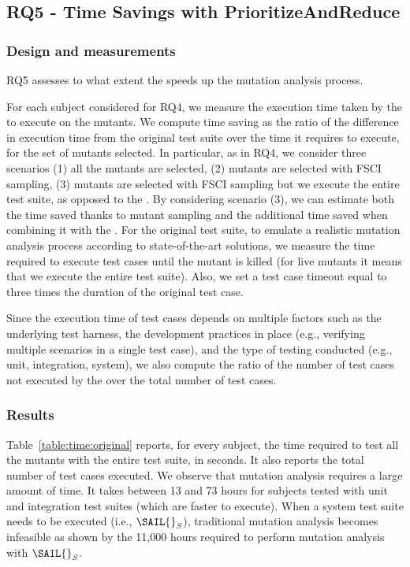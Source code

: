 \subsection{RQ5 - Time Savings with PrioritizeAndReduce}

\subsubsection{Design and measurements}

RQ5 assesses to what extent  the \MPTS speeds up the mutation analysis process.


For each subject considered for RQ4, we measure the execution time taken by the \MPTS to execute on the mutants.
We compute time saving as the ratio of the difference in execution time from the original test suite over the time it requires to execute, for the set of mutants selected.
In particular, as in RQ4, we consider three scenarios (1) all the mutants are selected, (2) mutants are selected with FSCI sampling, (3) mutants are selected with FSCI sampling but we execute the entire test suite, as opposed to the \MPTS. By considering scenario (3), we can estimate both the time saved thanks to mutant sampling and the additional time saved when combining it with the \MPTS.
For the original test suite, to emulate a realistic mutation analysis process according to state-of-the-art solutions, we measure the time required to execute test cases until the mutant is killed (for live mutants it means that we execute the entire test suite). Also, we set a test case timeout equal to three times the duration of the original test case.

Since the execution time of test cases depends on multiple factors such as the underlying test harness, the development practices in place (e.g., verifying multiple scenarios in a single test case), and the type of testing conducted (e.g., unit, integration, system), we also compute 
the ratio of the number of test cases not executed by the \MPTS over the total number of test cases.

\subsubsection{Results}

Table~\ref{table:time:original} reports, for every subject, the time required to test all the mutants with the entire test suite, in seconds. It also reports  the total number of test cases executed. 
We observe that mutation analysis requires a large amount of time. It takes between 13 and 73 hours for subjects tested with unit and integration test suites (which are faster to execute). When a system test suite needs to be executed (i.e., $\mathit{\SAIL{}_S}$), traditional mutation analysis becomes infeasible as shown by the 11,000 hours required to perform mutation analysis with $\mathit{\SAIL{}_S}$.

